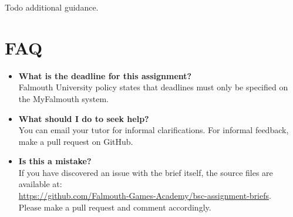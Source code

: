 \documentclass{../fal_assignment}
\begin{document}
Todo additional guidance.

\section*{FAQ}

\begin{itemize}
	\item 	\textbf{What is the deadline for this assignment?} \\ 
    		Falmouth University policy states that deadlines must only be specified on the MyFalmouth system.
    		
	\item 	\textbf{What should I do to seek help?} \\ 
    		You can email your tutor for informal clarifications. For informal feedback, make a pull request on GitHub. 
    		
    	\item 	\textbf{Is this a mistake?} \\ 	
    		If you have discovered an issue with the brief itself, the source files are available at: \\
    		\url{https://github.com/Falmouth-Games-Academy/bsc-assignment-briefs}.\\
    		 Please make a pull request and comment accordingly.
\end{itemize}


\end{document}
